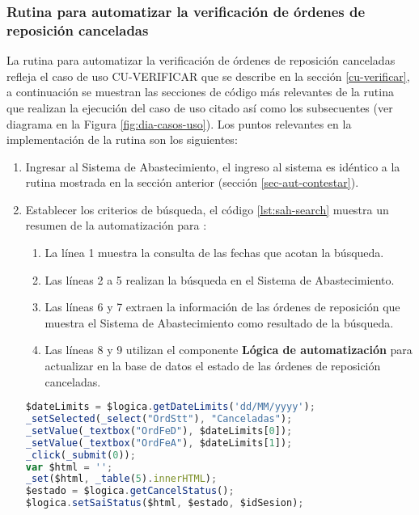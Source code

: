 \subsubsection{Rutina para automatizar la verificación de órdenes de reposición canceladas}
La rutina para automatizar la verificación de órdenes de reposición canceladas refleja el caso de uso  CU-VERIFICAR que se describe en la sección \ref{cu-verificar}, a continuación se muestran las secciones de código más relevantes de la rutina que realizan la ejecución del caso de uso citado así como los subsecuentes (ver diagrama en la Figura \ref{fig:dia-casos-uso}). Los puntos relevantes en la implementación de la rutina son los siguientes:
\begin{enumerate}
	\item Ingresar al Sistema de Abastecimiento, el ingreso al sistema es idéntico a la rutina mostrada en la sección anterior (sección \ref{sec-aut-contestar}).

	\item Establecer los criterios de búsqueda, el código \ref{lst:sah-search} muestra un resumen de la automatización para :
	\begin{enumerate}
		\item La línea 1 muestra la consulta de las fechas que acotan la búsqueda.
		\item Las líneas 2 a 5 realizan la búsqueda en el Sistema de Abastecimiento.
		\item Las líneas 6 y 7 extraen la información de las órdenes de reposición que muestra el Sistema de Abastecimiento como resultado de la búsqueda.
		\item Las líneas 8 y 9 utilizan el componente \textbf{Lógica de automatización} para actualizar en la base de datos el estado de las órdenes de reposición canceladas.
	\end{enumerate}
	\begin{lstlisting}[language=Javascript, caption={Responder orden de reposición.}, label={lst:sah-search}]
$dateLimits = $logica.getDateLimits('dd/MM/yyyy');
_setSelected(_select("OrdStt"), "Canceladas");
_setValue(_textbox("OrdFeD"), $dateLimits[0]);
_setValue(_textbox("OrdFeA"), $dateLimits[1]);
_click(_submit(0));
var $html = '';
_set($html, _table(5).innerHTML);
$estado = $logica.getCancelStatus();
$logica.setSaiStatus($html, $estado, $idSesion);
	\end{lstlisting}
\end{enumerate}

